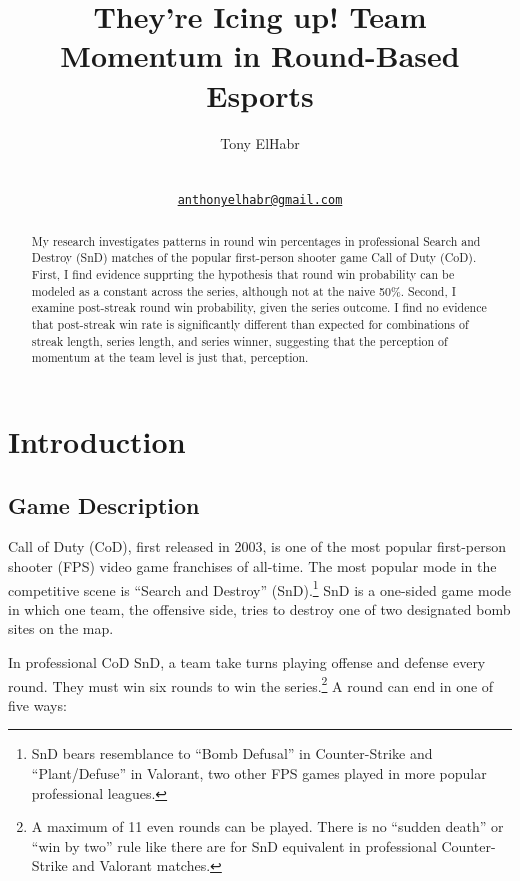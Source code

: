 \documentclass{article}
\title{They're Icing up! Team Momentum in Round-Based Esports}
\author{
    Tony ElHabr
   \\
     \\
   \\
  \texttt{\href{mailto:anthonyelhabr@gmail.com}{\nolinkurl{anthonyelhabr@gmail.com}}} \\
  }
\begin{document}
\maketitle


\begin{abstract}
My research investigates patterns in round win percentages in
professional Search and Destroy (SnD) matches of the popular
first-person shooter game Call of Duty (CoD). First, I find evidence
supprting the hypothesis that round win probability can be modeled as a
constant across the series, although not at the naive 50\%. Second, I
examine post-streak round win probability, given the series outcome. I
find no evidence that post-streak win rate is significantly different
than expected for combinations of streak length, series length, and
series winner, suggesting that the perception of momentum at the team
level is just that, perception.
\end{abstract}


\hypertarget{introduction}{%
\section{Introduction}\label{introduction}}

\hypertarget{game-description}{%
\subsection{Game Description}\label{game-description}}

Call of Duty (CoD), first released in 2003, is one of the most popular
first-person shooter (FPS) video game franchises of all-time. The most
popular mode in the competitive scene is ``Search and Destroy''
(SnD).\footnote{SnD bears resemblance to ``Bomb Defusal'' in
  Counter-Strike and ``Plant/Defuse'' in Valorant, two other FPS games
  played in more popular professional leagues.} SnD is a one-sided game
mode in which one team, the offensive side, tries to destroy one of two
designated bomb sites on the map.

In professional CoD SnD, a team take turns playing offense and defense
every round. They must win six rounds to win the series.\footnote{A
  maximum of 11 even rounds can be played. There is no ``sudden death''
  or ``win by two'' rule like there are for SnD equivalent in
  professional Counter-Strike and Valorant matches.} A round can end in
one of five ways:
\end{document}
